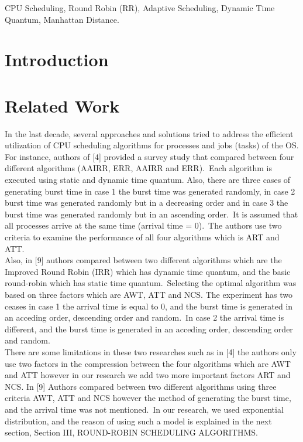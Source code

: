 \documentclass[conference]{IEEEtran}
\begin{document}
    \vspace{1em}

    \begin{IEEEkeywords}
        CPU Scheduling, Round Robin (RR), Adaptive Scheduling, Dynamic Time Quantum, Manhattan Distance.
    \end{IEEEkeywords}


    \section{Introduction}
    \label{sec:introduction}
    


    \section{Related Work}
    \label{sec:related-work}
    In the last decade, several approaches and solutions tried to
    address the efficient utilization of CPU scheduling algorithms
    for processes and jobs (tasks) of the OS. For instance, authors
    of [4] provided a survey study that compared between four
    different algorithms (AAIRR, ERR, AAIRR and ERR).~Each
    algorithm is executed using static and dynamic time quantum.
    Also, there are three cases of generating burst time in case 1
    the burst time was generated randomly, in case 2 burst time
    was generated randomly but in a decreasing order and in case
    3 the burst time was generated randomly but in an ascending
    order.~It is assumed that all processes arrive at the same time
    (arrival time = 0).~The authors use two criteria to examine the
    performance of all four algorithms which is ART and ATT.\\

    Also, in [9] authors compared between two different
    algorithms which are the Improved Round Robin (IRR) which
    has dynamic time quantum, and the basic round-robin which
    has static time quantum.~Selecting the optimal algorithm was
    based on three factors which are AWT, ATT and NCS. The
    experiment has two ceases in case 1 the arrival time is equal
    to 0, and the burst time is generated in an acceding order,
    descending order and random.~In case 2 the arrival time is
    different, and the burst time is generated in an acceding order,
    descending order and random.\\

    There are some limitations in these two researches such
    as in [4] the authors only use two factors in the compression
    between the four algorithms which are AWT and ATT however
    in our research we add two more important factors ART
    and NCS. In [9] Authors compared between two different
    algorithms using three criteria AWT, ATT and NCS however
    the method of generating the burst time, and the arrival time
    was not mentioned.~In our research, we used exponential
    distribution, and the reason of using such a model is explained in
    the next section, Section III, ROUND-ROBIN SCHEDULING
    ALGORITHMS.\@
\end{document}
